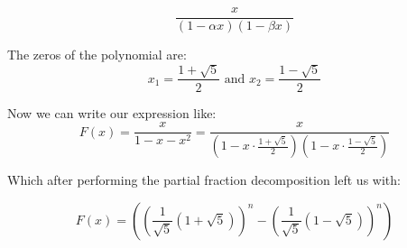 \[
\frac{x}{\left(1 - \alpha x\right)\left(1 - \beta x\right)}
\]

The zeros of the polynomial are:
\[
    x_1 = \frac{1 + \sqrt{5}}{2} \text{ and }  x_2 = \frac{1 - \sqrt{5}}{2}    
\]


Now we can write our expression like:
\[
F(x) = \frac{x}{1 - x - x^2} = \frac{x}{\left(1 - x \cdot \frac{1 + \sqrt{5}}{2}\right)\left(1 - x \cdot \frac{1 - \sqrt{5}}{2}\right)}
\]

Which after performing the partial fraction decomposition left us with:

\[
    F(x) = \left( \left( \frac{1}{\sqrt{5}} (1 + \sqrt{5}) \right)^n - \left( \frac{1}{\sqrt{5}} (1 - \sqrt{5}) \right)^n \right)
\]

\QED


